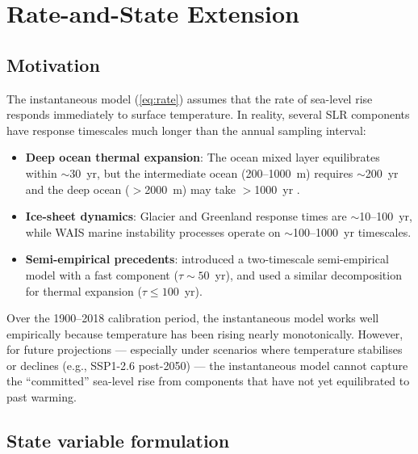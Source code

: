 \documentclass[11pt]{article}
\begin{document}
\section{Rate-and-State Extension}
\label{sec:ratestate}

\subsection{Motivation}

The instantaneous model (\cref{eq:rate}) assumes that the rate of sea-level rise responds immediately to surface temperature.  In reality, several SLR components have response timescales much longer than the annual sampling interval:

\begin{itemize}
  \item \textbf{Deep ocean thermal expansion}: The ocean mixed layer equilibrates within $\sim$30~yr, but the intermediate ocean (200--1000~m) requires $\sim$200~yr and the deep ocean ($>$2000~m) may take $>$1000~yr \citep{caldeira2013estimating}.
  \item \textbf{Ice-sheet dynamics}: Glacier and Greenland response times are $\sim$10--100~yr, while WAIS marine instability processes operate on $\sim$100--1000~yr timescales.
  \item \textbf{Semi-empirical precedents}: \citet{vermeer2009global} introduced a two-timescale semi-empirical model with a fast component ($\tau \sim 50$~yr), and \citet{mengel2016future} used a similar decomposition for thermal expansion ($\tau \leq 100$~yr).
\end{itemize}

Over the 1900--2018 calibration period, the instantaneous model works well empirically because temperature has been rising nearly monotonically.  However, for future projections --- especially under scenarios where temperature stabilises or declines (e.g., SSP1-2.6 post-2050) --- the instantaneous model cannot capture the ``committed'' sea-level rise from components that have not yet equilibrated to past warming.

\subsection{State variable formulation}
\end{document}
